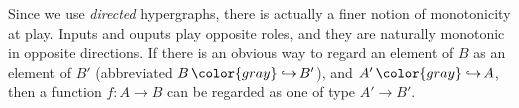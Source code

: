 \begin{subappendices}
\begin{wrapfigure}[5]{o}{1.6cm}
    \vspace{-3ex}
\end{wrapfigure}
Since we use \emph{directed} hypergraphs,
     there is actually a finer notion of monotonicity at play. 
Inputs and ouputs play opposite roles, 
    and they are naturally monotonic in opposite directions. 
If there is an obvious way to regard an element of $B$ as an element of $B'$ (abbreviated $B \,{\color{gray}\hookrightarrow}\, B'$),
and $A' \,{\color{gray}\hookrightarrow}\, A$, 
then
a function $f : A \to B$ can be regarded as one of type $A'\to B'$.

\end{subappendices}
